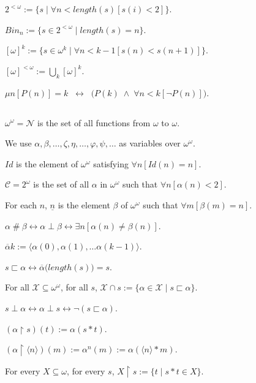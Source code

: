 \documentclass[a4paper]{amsart}
\theoremstyle{plain}
\begin{document}
\smallskip $2^{<\omega}:=\{s\mid\forall n<length(s)[s(i)<2]\}$. 

\smallskip 
$Bin_n:=\{s\in 2^{<\omega}\mid length(s)=n\}$. 

\smallskip
 $[\omega]^k:=\{s\in \omega^k\mid\forall n<k-1[s(n)<s(n+1)]\}$. 

\smallskip $[\omega]^{<\omega}:=\bigcup_k [\omega]^k$.

 \smallskip $\mu n[P(n)]=k\;\;\leftrightarrow \;\;\bigl(P(k)\;\wedge\;\forall n<k[\neg P(n)]\bigr)$. 

\subsection{}

$\omega^\omega=\mathcal{N}$ is the set of all functions from $\omega$ to $\omega$. 

 


\smallskip We use $\alpha, \beta, \ldots, \zeta, \eta, \ldots, \varphi, \psi, \ldots$ as variables over $\omega^\omega$.

\smallskip $Id$ is the element of $\omega^\omega$ satisfying $\forall n[Id(n)=n]$.

\smallskip $\mathcal{C}=2^\omega$ is the set of all $\alpha$ in $\omega^\omega$ such that 
$\forall n[\alpha(n)<2]$.

\smallskip
For each $n$, $\underline n$ is the element $\beta$ of $\omega^\omega$ such that $\forall m[\beta(m)=n]$. 

\smallskip $\alpha\;\#\:\beta \leftrightarrow \alpha\perp\beta\leftrightarrow \exists n[\alpha(n)\neq \beta(n)]$.

\smallskip $\overline \alpha k:=\langle  \alpha(0), \alpha(1), \ldots \alpha(k-1)\rangle$.

\smallskip $s\sqsubset\alpha \leftrightarrow \overline \alpha\bigl(length(s)\bigr)= s$.

\smallskip For all $\mathcal{X}\subseteq \omega^\omega$, for all $s$, $\mathcal{X}\cap s:=\{\alpha\in\mathcal{X}\mid s\sqsubset \alpha\}$.

\smallskip $s\perp \alpha\leftrightarrow \alpha\perp s\leftrightarrow \neg(s\sqsubset \alpha)$. 

\smallskip $(\alpha\upharpoonright s)(t):=\alpha(s\ast t)$.

\smallskip $(\alpha\upharpoonright\langle n \rangle)(m) :=\alpha^n(m) :=\alpha(\langle n \rangle \ast m)$. 

\smallskip For every $X\subseteq \omega$, for every $s$, $X\upharpoonright s:=\{t\mid s\ast t \in X\}$.
 
\end{document}
